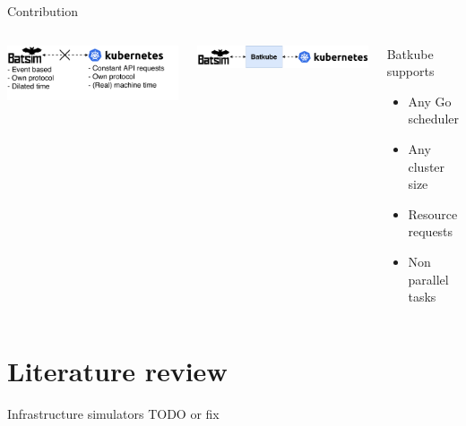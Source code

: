 \documentclass[12pt, aspectratio=43]{beamer}
\begin{document}
\begin{frame}{Contribution}
	\begin{columns}
		\includegraphics[width=\textwidth]{../imgs/problematic.pdf}

		\vspace{1cm}

		\includegraphics[width=\textwidth]{../imgs/contribution.pdf}

		\begin{exampleblock}{Batkube supports}
			\begin{itemize}
				\item Any Go scheduler
				\item Any cluster size
				\item Resource requests
				\item Non parallel tasks
			\end{itemize}
		\end{exampleblock}
	\end{columns}
\end{frame}

\section{Literature review}

\begin{frame}{Infrastructure simulators}
	TODO or fix
\end{frame}
\end{document}
